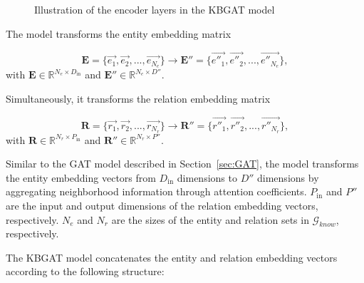 \begin{figure}[htp]
{
	}
	\caption{Illustration of the encoder layers in the KBGAT model}
	\label{fig:encoderKBGAT}
\end{figure}


The model transforms the entity embedding matrix

\[
\mathbf{E} = \Big\{\overrightarrow{e_1}, \overrightarrow{e_2}, ...,  \overrightarrow{e_{N_e}}\Big\} \xrightarrow{} \mathbf{E''} = \Big\{\overrightarrow{e''_1}, \overrightarrow{e''_2}, ...,  \overrightarrow{e''_{N_e}}\Big\},
\]
with $\mathbf{E} \in \mathbb{R}^{N_e \times D_{\text{in}}}$ and $\mathbf{E''} \in \mathbb{R}^{N_e \times D''}$.

Simultaneously, it transforms the relation embedding matrix

\[
\mathbf{R} = \Big\{\overrightarrow{r_1}, \overrightarrow{r_2}, ...,  \overrightarrow{r_{N_r}}\Big\} \xrightarrow{} \mathbf{R''} = \Big\{\overrightarrow{r''_1}, \overrightarrow{r''_2}, ...,  \overrightarrow{r''_{N_r}}\Big\},
\]
with $\mathbf{R} \in \mathbb{R}^{N_r \times P_{\text{in}}}$ and $\mathbf{R''} \in \mathbb{R}^{N_r \times P''}$.

Similar to the GAT model described in Section~\ref{sec:GAT}, the model transforms the entity embedding vectors from $D_{\text{in}}$ dimensions to $D''$ dimensions by aggregating neighborhood information through attention coefficients. $P_{\text{in}}$ and $P''$ are the input and output dimensions of the relation embedding vectors, respectively. $N_e$ and $N_r$ are the sizes of the entity and relation sets in $\mathcal{G}_{know}$, respectively.

The KBGAT model concatenates the entity and relation embedding vectors according to the following structure:

